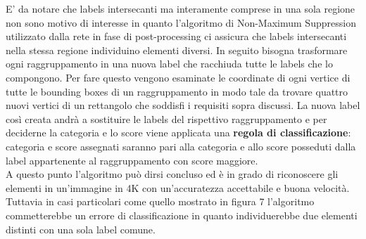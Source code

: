 E' da notare che labels intersecanti ma interamente comprese in una sola regione non sono motivo di interesse in quanto l'algoritmo di Non-Maximum Suppression utilizzato dalla rete in fase di post-processing ci assicura che labels intersecanti nella stessa regione individuino elementi diversi.
In seguito bisogna trasformare ogni raggruppamento in una nuova label che racchiuda tutte le labels che lo compongono. Per fare questo vengono esaminate le coordinate di ogni vertice di tutte le bounding boxes di un raggruppamento in modo tale da trovare quattro nuovi vertici di un rettangolo che soddisfi i requisiti sopra discussi. La nuova label così creata andrà a sostituire le labels del rispettivo raggruppamento e per deciderne la categoria e lo score viene applicata una \textbf{regola di classificazione}: categoria e score assegnati saranno pari alla categoria e allo score posseduti dalla label appartenente al raggruppamento con score maggiore.\\
A questo punto l'algoritmo può dirsi concluso ed è in grado di riconoscere gli elementi in un'immagine in 4K con un'accuratezza accettabile e buona velocità. Tuttavia in casi particolari come quello mostrato in figura 7 l'algoritmo commetterebbe un errore di classificazione in quanto individuerebbe due elementi distinti con una sola label comune.
